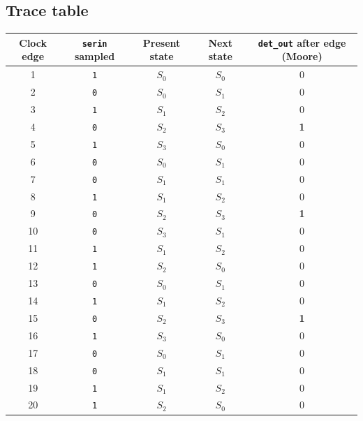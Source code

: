 \documentclass[10pt,a4paper]{article}
\begin{document}
\subsection{Trace table}
\begin{center}\small
\begin{tabular}{c c c c c}
\toprule
Clock edge & \texttt{serin} sampled & Present state & Next state & \texttt{det\_out} {\scriptsize after edge (Moore)}\\
\midrule
1 & \texttt{1} & $S_{0}$ & $S_{0}$ & 0\\
2 & \texttt{0} & $S_{0}$ & $S_{1}$ & 0\\
3 & \texttt{1} & $S_{1}$ & $S_{2}$ & 0\\
\rowcolor{red!12}4 & \texttt{0} & $S_{2}$ & $S_{3}$ & \textbf{1}\\
5 & \texttt{1} & $S_{3}$ & $S_{0}$ & 0\\
6 & \texttt{0} & $S_{0}$ & $S_{1}$ & 0\\
7 & \texttt{0} & $S_{1}$ & $S_{1}$ & 0\\
8 & \texttt{1} & $S_{1}$ & $S_{2}$ & 0\\
\rowcolor{red!12}9 & \texttt{0} & $S_{2}$ & $S_{3}$ & \textbf{1}\\
10 & \texttt{0} & $S_{3}$ & $S_{1}$ & 0\\
11 & \texttt{1} & $S_{1}$ & $S_{2}$ & 0\\
12 & \texttt{1} & $S_{2}$ & $S_{0}$ & 0\\
13 & \texttt{0} & $S_{0}$ & $S_{1}$ & 0\\
14 & \texttt{1} & $S_{1}$ & $S_{2}$ & 0\\
\rowcolor{red!12}15 & \texttt{0} & $S_{2}$ & $S_{3}$ & \textbf{1}\\
16 & \texttt{1} & $S_{3}$ & $S_{0}$ & 0\\
17 & \texttt{0} & $S_{0}$ & $S_{1}$ & 0\\
18 & \texttt{0} & $S_{1}$ & $S_{1}$ & 0\\
19 & \texttt{1} & $S_{1}$ & $S_{2}$ & 0\\
20 & \texttt{1} & $S_{2}$ & $S_{0}$ & 0\\
\bottomrule
\end{tabular}\end{center}
\end{document}
